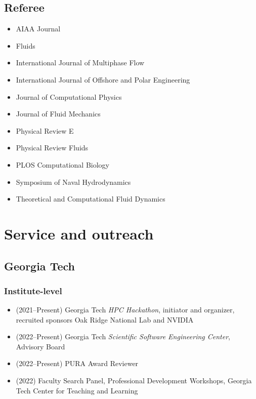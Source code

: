 \subsection{Referee}

\begin{itemize}
    \item AIAA Journal
    \item Fluids
    \item International Journal of Multiphase Flow
    \item International Journal of Offshore and Polar Engineering
    \item Journal of Computational Physics
    \item Journal of Fluid Mechanics
    \item Physical Review E
    \item Physical Review Fluids
    \item PLOS Computational Biology
    \item Symposium of Naval Hydrodynamics
    \item Theoretical and Computational Fluid Dynamics
\end{itemize}

\section{Service and outreach}

\subsection{Georgia Tech}

\subsubsection{Institute-level}

\begin{itemize}
    \item (2021--Present) Georgia Tech \textit{HPC Hackathon}, initiator and organizer, recruited sponsors Oak Ridge National Lab and NVIDIA 
    \item (2022--Present) Georgia Tech \textit{Scientific Software Engineering Center}, Advisory Board
    \item (2022--Present) PURA Award Reviewer
    \item (2022) Faculty Search Panel, Professional Development Workshops, Georgia Tech Center for Teaching and Learning
\end{itemize}

